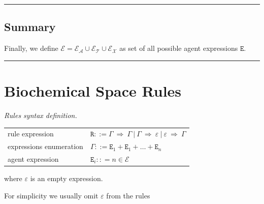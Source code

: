 \documentclass{elsarticle}
\begin{document}
\noindent\rule{\textwidth}{1pt}

 \subsection{Summary}

\begin{definition}
Finally, we define $\mathcal{E} = \mathcal{E}_\mathcal{A} \cup \mathcal{E}_\mathcal{T} \cup \mathcal{E}_\mathcal{X}$ as set of all possible agent expressions $\mathtt{E}$.
\end{definition}



\noindent\rule{\textwidth}{1pt}


\section{Biochemical Space Rules}

\begin{definition}\label{rules}
\emph{Rules syntax definition.}

\begin{center}
{\small
\hspace*{-1cm}\begin{tabular}{ l l }
 rule expression & $\mathtt{R} ::= \Gamma ~\Rightarrow~ \Gamma ~|~ \Gamma ~\Rightarrow~ \varepsilon ~|~ \varepsilon~ \Rightarrow~ \Gamma $\\
 expressions enumeration & $\Gamma ::= \mathtt{E}_1 + \mathtt{E}_1 + \ldots + \mathtt{E}_n$\\
 agent expression & $\mathtt{E}_i :: = n \in \mathcal{E}$\\
\end{tabular}
}
\end{center}

where $\varepsilon$ is an empty expression.
\end{definition}

For simplicity we usually omit $\varepsilon$ from the rules
\end{document}
